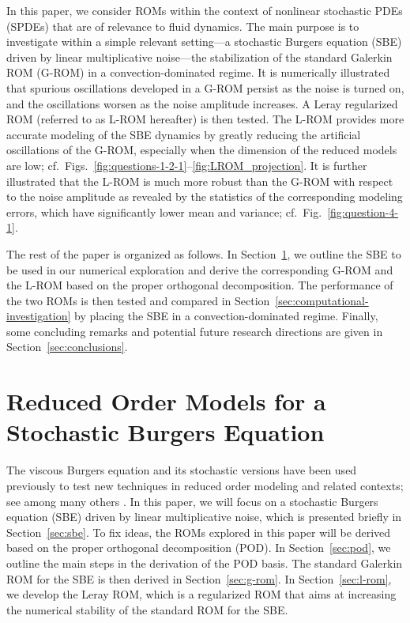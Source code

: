 \documentclass[11pt]{amsart}
\numberwithin{equation}{section}
\begin{document}
  
In this paper, we consider ROMs within the context of nonlinear stochastic PDEs (SPDEs) that are of relevance to fluid dynamics. The main purpose is to investigate within a simple relevant setting---a stochastic Burgers equation (SBE) driven by linear multiplicative noise---the stabilization of the standard Galerkin ROM (G-ROM) in a convection-dominated regime. It is numerically illustrated that spurious oscillations developed in a G-ROM persist as the noise is turned on, and the oscillations worsen as the noise amplitude increases. A Leray regularized ROM (referred to as L-ROM hereafter) is then tested. The L-ROM provides more accurate modeling of the SBE dynamics by greatly reducing the artificial oscillations of the G-ROM, especially when the dimension of the reduced models are low; cf.~Figs.~\ref{fig:questions-1-2-1}--\ref{fig:LROM_projection}. It is further illustrated that the L-ROM is much more robust than the G-ROM with respect to the noise amplitude as revealed by the statistics of the corresponding modeling errors, which have significantly lower mean and variance; cf.~Fig.~\ref{fig:question-4-1}.

The rest of the paper is organized as follows. In Section~\ref{sec:rom}, we outline the SBE to be used in our numerical exploration and derive the corresponding G-ROM and the L-ROM based on the proper orthogonal decomposition. The performance of the two ROMs is then tested and compared in Section~\ref{sec:computational-investigation} by placing the SBE in a convection-dominated regime. Finally, some concluding remarks and potential future research directions are given in Section~\ref{sec:conclusions}.




\section{Reduced Order Models for a Stochastic Burgers Equation}
	\label{sec:rom}

The viscous Burgers equation and its stochastic versions have been used previously to test new techniques in reduced order modeling and related contexts; see among many others \cite{CLW15_vol2,CLW16_additive,KV99,KV01,CL15,nguyen2009reduced}. In this paper, we will focus on a stochastic Burgers equation (SBE) driven by linear multiplicative noise, which is presented briefly in Section~\ref{sec:sbe}. To fix ideas, the ROMs explored in this paper will be derived based on the proper orthogonal decomposition (POD). In Section~\ref{sec:pod}, we outline the main steps in the derivation of the POD basis. The standard Galerkin ROM for the SBE is then derived in Section~\ref{sec:g-rom}. In Section~\ref{sec:l-rom}, we develop the Leray ROM, which is a regularized ROM that aims at increasing the numerical stability of the standard ROM for the SBE.
\end{document}
